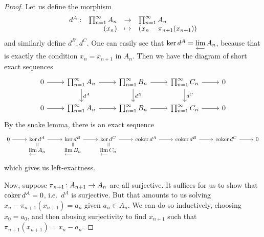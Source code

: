 \begin{proof}
    Let us define the morphism
    \begin{equation*}
        \begin{array}{rrcl} {d^A}: & {\prod_{n=1}^\infty A_n} &\to & {\prod_{n=1}^\infty A_n} \\ & {(x_n)} &\mapsto & {(x_n - \pi_{n+1}(x_{n+1}))} \end{array}
    \end{equation*}
    and similarly define \(d^B,d^C\).
    One can easily see that \(\ker d^A = \operatorname{\displaystyle\lim_{\longleftarrow}} A_n\),
    because that is exactly the condition \(x_n = x_{n+1}\) in \(A_n\).
    Then we have the diagram of short exact sequences
    \begin{equation*}
        \begin{tikzcd}
            0 \arrow{r} & \prod_{n=1}^\infty A_n \arrow{r} \arrow{d}{d^A} & \prod_{n=1}^\infty B_n \arrow{r} \arrow{d}{d^B} & \prod_{n=1}^\infty C_n \arrow{r} \arrow{d}{d^C} & 0 \\
            0 \arrow{r} & \prod_{n=1}^\infty A_n \arrow{r} & \prod_{n=1}^\infty B_n \arrow{r} & \prod_{n=1}^\infty C_n \arrow{r} & 0
        \end{tikzcd}
    \end{equation*}
    By the \hyperref[lem:snake]{snake lemma},
    there is an exact sequence
    \begin{equation*}
        \begin{tikzcd}[row sep=tiny]
            0 \arrow{r} & \ker d^A \arrow{r} \arrow[phantom]{d}[sloped]{=} & \ker d^B \arrow{r} \arrow[phantom]{d}[sloped]{=} & \ker d^C \arrow{r} \arrow[phantom]{d}[sloped]{=} &
            \coker d^A \arrow{r} & \coker d^B \arrow{r} & \coker d^C \arrow{r} & 0 \\
            & \invlim A_n & \invlim B_n & \invlim C_n
        \end{tikzcd}
    \end{equation*}
    which gives us left-exactness.

    Now, suppose \(\pi_{n+1}\colon A_{n+1}\to A_n\) are all surjective.
    It suffices for us to show that \(\operatorname{coker} d^A = 0\), i.e.\ \(d^A\) is surjective.
    But that amounts to us solving \(x_n - \pi_{n+1}(x_{n+1}) = a_n\) given \(a_n \in A_n\).
    We can do so inductively, choosing \(x_0 = a_0\),
    and then abusing surjectivity to find \(x_{n+1}\) such that \(\pi_{n+1}(x_{n+1}) = x_n - a_n\).
\end{proof}

